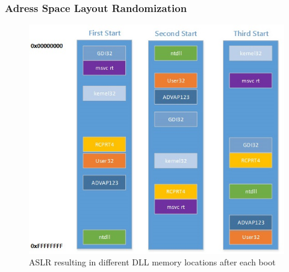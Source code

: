 \subsubsection{Adress Space Layout Randomization}
\label{sec:aslr}
\begin{figure}[h]
\centering
\includegraphics[width=\textwidth,height=\textheight,keepaspectratio]{sections/background/defenses/aslr.jpg}
\caption{\gls{ASLR} resulting in different DLL memory locations after each boot}
\label{fig:aslr}
\end{figure}
